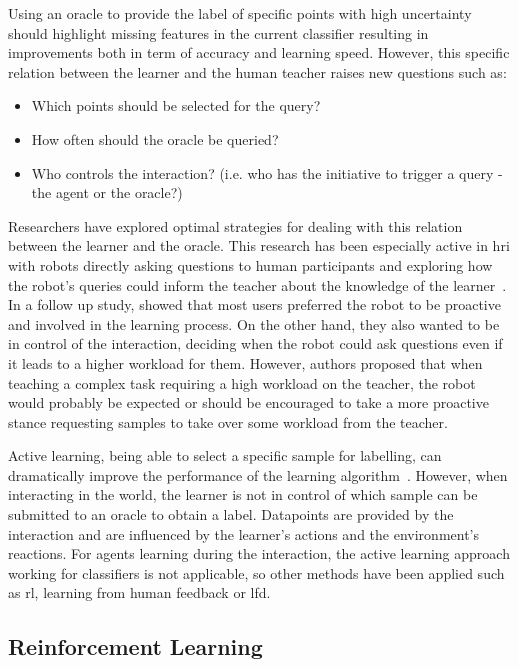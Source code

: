Using an oracle to provide the label of specific points with high uncertainty should highlight missing features in the current classifier resulting in improvements both in term of accuracy and learning speed. However, this specific relation between the learner and the human teacher raises new questions such as: 
\begin{itemize}
	\item Which points should be selected for the query?
	\item How often should the oracle be queried?
	\item Who controls the interaction? (i.e. who has the initiative to trigger a query - the agent or the oracle?)
\end{itemize}

Researchers have explored optimal strategies for dealing with this relation between the learner and the oracle. This research has been especially active in \gls{hri} with robots directly asking questions to human participants and exploring how the robot's queries could inform the teacher about the knowledge of the learner~\citep{chao2010transparent}. In a follow up study, \cite{cakmak2010designing} showed that most users preferred the robot to be proactive and involved in the learning process. On the other hand, they also wanted to be in control of the interaction, deciding when the robot could ask questions even if it leads to a higher workload for them. However, authors proposed that when teaching a complex task requiring a high workload on the teacher, the robot would probably be expected or should be encouraged to take a more proactive stance requesting samples to take over some workload from the teacher.

Active learning, being able to select a specific sample for labelling, can dramatically improve the performance of the learning algorithm~\citep{settles2012active}. However, when interacting in the world, the learner is not in control of which sample can be submitted to an oracle to obtain a label. Datapoints are provided by the interaction and are influenced by the learner's actions and the environment's reactions. For agents learning during the interaction, the active learning approach working for classifiers is not applicable, so other methods have been applied such as \gls{rl}, learning from human feedback or \gls{lfd}.

\subsection{Reinforcement Learning} \label{ssec:back_rl}

